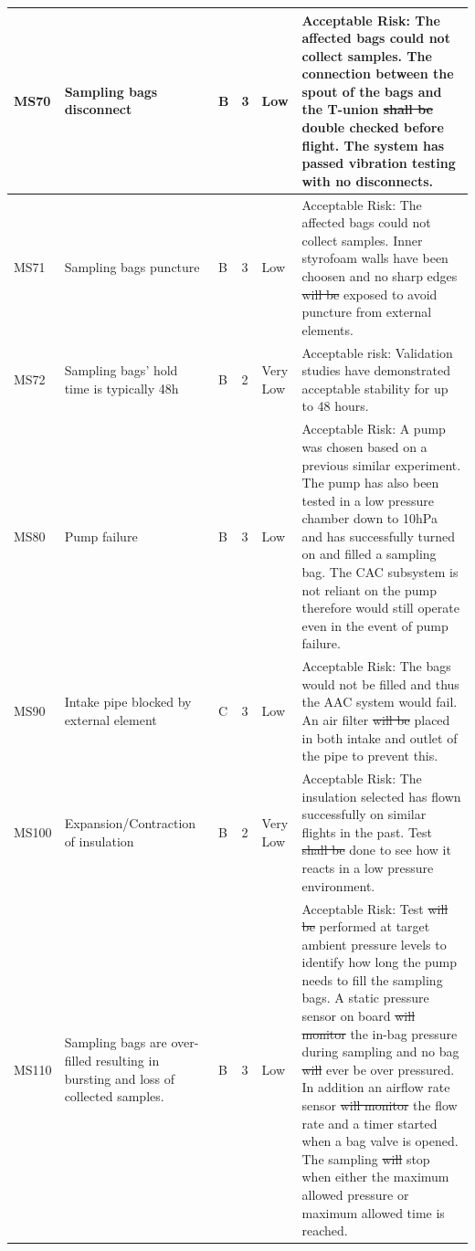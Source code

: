 \documentclass[a4paper,12pt,oneside]{article}
\providecommand{\DIFaddtex}[1]{{\protect\color{blue}\uwave{#1}}} %
\providecommand{\DIFdeltex}[1]{{\protect\color{red}\sout{#1}}}                      %
\providecommand{\DIFaddbegin}{} %
\providecommand{\DIFaddend}{} %
\providecommand{\DIFdelbegin}{} %
\providecommand{\DIFdelend}{} %
\providecommand{\DIFadd}[1]{\texorpdfstring{\DIFaddtex{#1}}{#1}} %
\providecommand{\DIFdel}[1]{\texorpdfstring{\DIFdeltex{#1}}{}} %
\newcommand{\DIFscaledelfig}{0.5}
\newlength{\DIFdelgraphicswidth} %
\newlength{\DIFdelgraphicsheight} %
\newcommand{\DIFaddincludegraphics}[2][]{{\color{blue}\fbox{\DIFOincludegraphics[#1]{#2}}}} %
\newcommand{\DIFdelincludegraphics}[2][]{%
\sbox{\DIFdelgraphicsbox}{\DIFOincludegraphics[#1]{#2}}%
\settoboxwidth{\DIFdelgraphicswidth}{\DIFdelgraphicsbox} %
\settoboxtotalheight{\DIFdelgraphicsheight}{\DIFdelgraphicsbox} %
\scalebox{\DIFscaledelfig}{%
\parbox[b]{\DIFdelgraphicswidth}{\usebox{\DIFdelgraphicsbox}\\[-\baselineskip] \rule{\DIFdelgraphicswidth}{0em}}\llap{\resizebox{\DIFdelgraphicswidth}{\DIFdelgraphicsheight}{%
\setlength{\unitlength}{\DIFdelgraphicswidth}%
\begin{picture}(1,1)%
\thicklines\linethickness{2pt} %
{\color[rgb]{1,0,0}\put(0,0){\framebox(1,1){}}}%
{\color[rgb]{1,0,0}\put(0,0){\line( 1,1){1}}}%
{\color[rgb]{1,0,0}\put(0,1){\line(1,-1){1}}}%
\end{picture}%
}\hspace*{3pt}}} %
} %
\DeclareRobustCommand{\DIFaddbegin}{\DIFOaddbegin \let\includegraphics\DIFaddincludegraphics} %
\DeclareRobustCommand{\DIFaddend}{\DIFOaddend \let\includegraphics\DIFOincludegraphics} %
\DeclareRobustCommand{\DIFdelbegin}{\DIFOdelbegin \let\includegraphics\DIFdelincludegraphics} %
\DeclareRobustCommand{\DIFdelend}{\DIFOaddend \let\includegraphics\DIFOincludegraphics} %
\begin{document}
\begin{landscape}
\begin{longtable}{|m{}| m{} |m{} |m{}|m{}| m{}|}
MS70 & Sampling bags disconnect & B & 3 & \cellcolor[HTML]{FCFF2F}Low & Acceptable Risk: The affected bags could not collect samples. The connection between the spout of the bags and the T-union \DIFdelbegin \DIFdel{shall be }\DIFdelend \DIFaddbegin \DIFadd{was }\DIFaddend double checked before flight. The system has passed vibration testing with no disconnects. \\ \hline
MS71 & Sampling bags puncture & B & 3 & \cellcolor[HTML]{FCFF2F}Low & Acceptable Risk: The affected bags could not collect samples. Inner styrofoam walls have been choosen and no sharp edges \DIFdelbegin \DIFdel{will be }\DIFdelend \DIFaddbegin \DIFadd{were }\DIFaddend exposed to avoid puncture from external elements. \\ \hline
MS72 & Sampling bags' hold time is typically 48h & B & 2 & \cellcolor[HTML]{34FF34}Very Low & Acceptable risk: Validation studies have demonstrated acceptable stability for up to 48 hours.  \\ \hline
MS80 & Pump failure & B & 3 & \cellcolor[HTML]{FCFF2F}Low & Acceptable Risk: A pump was chosen based on a previous similar experiment. The pump has also been tested in a low pressure chamber down to 10hPa and has successfully turned on and filled a sampling bag. The CAC subsystem is not reliant on the pump therefore would still operate even in the event of pump failure. \\ \hline
MS90 & Intake pipe blocked by external element & C & 3 & \cellcolor[HTML]{FCFF2F}Low & Acceptable Risk: The bags would not be filled and thus the AAC system would fail. An air filter \DIFdelbegin \DIFdel{will be }\DIFdelend \DIFaddbegin \DIFadd{was }\DIFaddend placed in both intake and outlet of the pipe to prevent this. \\ \hline
MS100 & Expansion/Contraction of insulation & B & 2 &\cellcolor[HTML]{34FF34}Very Low & Acceptable Risk: The insulation selected has flown successfully on similar flights in the past. Test \DIFdelbegin \DIFdel{shall be }\DIFdelend \DIFaddbegin \DIFadd{was }\DIFaddend done to see how it reacts in a low pressure environment. \\ \hline
MS110 & Sampling bags are over-filled resulting in bursting and loss of collected samples. & B & 3 & \cellcolor[HTML]{FCFF2F}Low & Acceptable Risk: Test \DIFdelbegin \DIFdel{will be }\DIFdelend \DIFaddbegin \DIFadd{was }\DIFaddend performed at target ambient pressure levels to identify how long the pump needs to fill the sampling bags. A static pressure sensor on board \DIFdelbegin \DIFdel{will monitor }\DIFdelend \DIFaddbegin \DIFadd{monitored }\DIFaddend the in-bag pressure during sampling and no bag \DIFdelbegin \DIFdel{will }\DIFdelend \DIFaddbegin \DIFadd{would }\DIFaddend ever be over pressured. In addition an airflow rate sensor \DIFdelbegin \DIFdel{will monitor }\DIFdelend \DIFaddbegin \DIFadd{monitored }\DIFaddend the flow rate and a timer started when a bag valve is opened. The sampling \DIFdelbegin \DIFdel{will }\DIFdelend \DIFaddbegin \DIFadd{would }\DIFaddend stop when either the maximum allowed pressure or maximum allowed time is reached. \\ \hline

\end{longtable}
\end{landscape}
\end{document}

